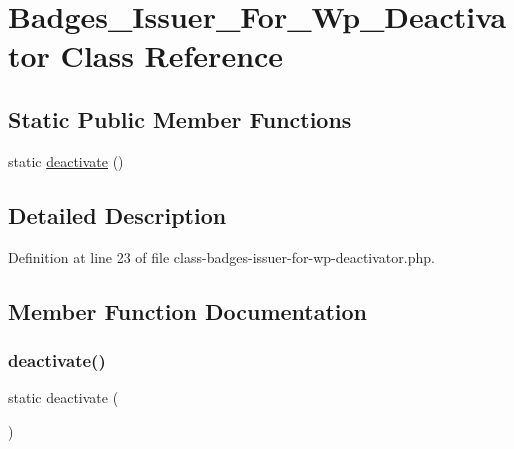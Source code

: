 \hypertarget{class_badges___issuer___for___wp___deactivator}{}\section{Badges\+\_\+\+Issuer\+\_\+\+For\+\_\+\+Wp\+\_\+\+Deactivator Class Reference}
\label{class_badges___issuer___for___wp___deactivator}
\subsection*{Static Public Member Functions}
\begin{DoxyCompactItemize}
\item 
static \hyperlink{class_badges___issuer___for___wp___deactivator_a7f313467415045368c0633e67a2b6d75}{deactivate} ()
\end{DoxyCompactItemize}


\subsection{Detailed Description}


Definition at line 23 of file class-\/badges-\/issuer-\/for-\/wp-\/deactivator.\+php.



\subsection{Member Function Documentation}
\mbox{\label{class_badges___issuer___for___wp___deactivator_a7f313467415045368c0633e67a2b6d75}} 
\subsubsection{\texorpdfstring{deactivate()}{deactivate()}}
{\footnotesize\ttfamily static deactivate (\begin{DoxyParamCaption}{ }\end{DoxyParamCaption})\hspace{0.3cm}{\ttfamily [static]}}

